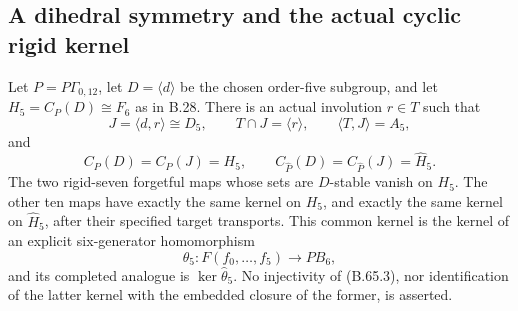 \subsection*{A dihedral symmetry and the actual cyclic rigid kernel}

Let $P=P\Gamma_{0,12}$, let $D=\langle d\rangle$ be the chosen
order-five subgroup, and let $H_5=C_P(D)\cong F_6$ as in B.28.
There is an actual involution $r\in T$ such that
\[
 J=\langle d,r\rangle\cong D_5,
 \qquad T\cap J=\langle r\rangle,
 \qquad\langle T,J\rangle=A_5,
                                                               \tag{B.65.1}
\]
and
\[
 C_P(D)=C_P(J)=H_5,\qquad
 C_{\widehat P}(D)=C_{\widehat P}(J)=\widehat H_5.
                                                               \tag{B.65.2}
\]
The two rigid-seven forgetful maps whose sets are $D$-stable
vanish on $H_5$.  The other ten maps have exactly the same
kernel on $H_5$, and exactly the same kernel on
$\widehat H_5$, after their specified target transports.
This common kernel is the kernel of an explicit six-generator
homomorphism
\[
 \theta_5:F(f_0,\ldots,f_5)\longrightarrow PB_6,
                                                               \tag{B.65.3}
\]
and its completed analogue is $\ker\widehat\theta_5$.
No injectivity of (B.65.3), nor identification of the latter
kernel with the embedded closure of the former, is asserted.


